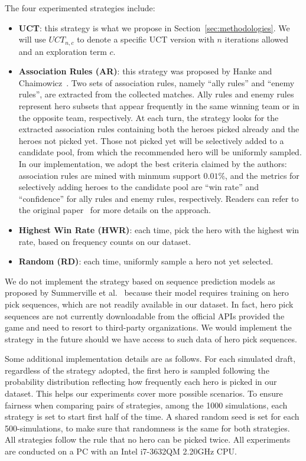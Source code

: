 The four experimented strategies include:
\begin{itemize}[leftmargin=*]
\item \textbf{UCT}: this strategy is what we propose in Section~\ref{sec:methodologies}. We will use $UCT_{n,c}$ to denote a specific UCT version with $n$ iterations allowed and an exploration term $c$. 
\item \textbf{Association Rules (AR)}: this strategy was proposed by Hanke and Chaimowicz~\cite{hanke2017reco}. Two sets of association rules, namely ``ally rules'' and ``enemy rules'', are extracted from the collected matches. Ally rules and enemy rules represent hero subsets that appear frequently in the same winning team or in the opposite team, respectively. At each turn, the strategy looks for the extracted association rules containing both the heroes picked already and the heroes not picked yet. Those not picked yet will be selectively added to a candidate pool, from which the recommended hero will be uniformly sampled. In our implementation, we adopt the best criteria claimed by the authors: association rules are mined with minmum support $0.01\%$, and the metrics for selectively adding heroes to the candidate pool are ``win rate'' and ``confidence'' for ally rules and enemy rules, respectively. Readers can refer to the original paper~\cite{hanke2017reco} for more details on the approach. 
\item \textbf{Highest Win Rate (HWR)}: each time, pick the hero with the highest win rate, based on frequency counts on our dataset. 
\item \textbf{Random (RD)}: each time, uniformly sample a hero not yet selected. 
\end{itemize}

We do not implement the strategy based on sequence prediction models as proposed by Summerville et al.~\cite{summerville2017reco} because their model requires training on hero pick sequences, which are not readily available in our dataset. In fact, hero pick sequences are not currently downloadable from the official APIs provided the game and need to resort to third-party organizations. We would implement the strategy in the future should we have access to such data of hero pick sequences.

Some additional implementation details are as follows. For each simulated draft, regardless of the strategy adopted, the first hero is sampled following the probability distribution reflecting how frequently each hero is picked in our dataset. This helps our experiments cover more possible scenarios. To ensure fairness when comparing pairs of strategies, among the 1000 simulations, each strategy is set to start first half of the time. A shared random seed is set for each 500-simulations, to make sure that randomness is the same for both strategies. All strategies follow the rule that no hero can be picked twice. All experiments are conducted on a PC with an Intel i7-3632QM 2.20GHz CPU.

